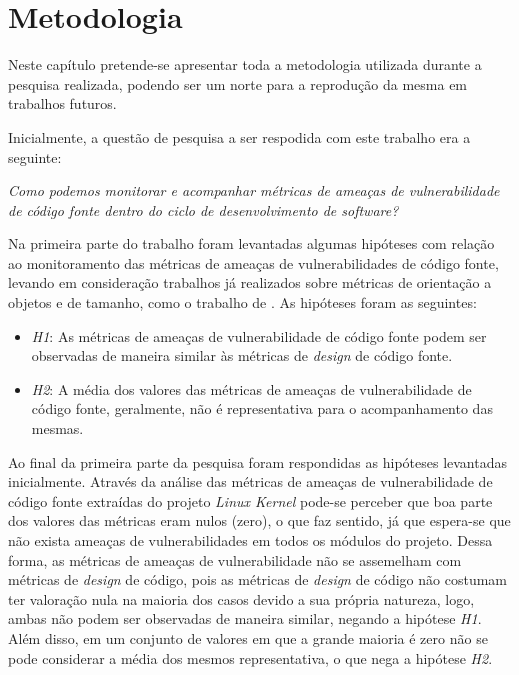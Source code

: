 \chapter{Metodologia}\label{metodologia}

Neste capítulo pretende-se apresentar toda a metodologia utilizada durante a
pesquisa realizada, podendo ser um norte para a reprodução da mesma em trabalhos
futuros.

Inicialmente, a questão de pesquisa a ser respodida com este trabalho era a
seguinte:

\begin{center}
  \textit{Como podemos monitorar e acompanhar métricas de ameaças de
    vulnerabilidade de código fonte dentro do ciclo de desenvolvimento de
    software?
}
\end{center}

Na primeira parte do trabalho foram levantadas algumas hipóteses com relação ao
monitoramento das métricas de ameaças de vulnerabilidades de código fonte,
levando em consideração trabalhos já realizados sobre métricas de orientação a
objetos e de tamanho, como o trabalho de . As hipóteses
foram as seguintes:

\begin{itemize}
  \item \textit{H1}: As métricas de ameaças de vulnerabilidade de código fonte
  podem ser observadas de maneira similar às métricas de \textit{design} de código
  fonte.

  \item \textit{H2}: A média dos valores das métricas de ameaças de vulnerabilidade de
  código fonte, geralmente, não é representativa para o acompanhamento das mesmas.

\end{itemize}

Ao final da primeira parte da pesquisa foram respondidas as hipóteses levantadas
inicialmente. Através da análise das métricas de ameaças de vulnerabilidade de
código fonte extraídas do projeto \textit{Linux Kernel} pode-se perceber que boa
parte dos valores das métricas eram nulos (zero), o que faz sentido, já que
espera-se que não exista ameaças de vulnerabilidades em todos os módulos do
projeto. Dessa forma, as métricas de ameaças de vulnerabilidade não se
assemelham com métricas de \textit{design} de código, pois as métricas de
\textit{design} de código não costumam ter valoração nula na maioria dos casos
devido a sua própria natureza, logo, ambas não podem ser observadas de maneira
similar, negando a hipótese \textit{H1}. Além disso, em um conjunto de valores
em que a grande maioria é zero não se pode considerar a média dos mesmos
representativa, o que nega a hipótese \textit{H2}.

